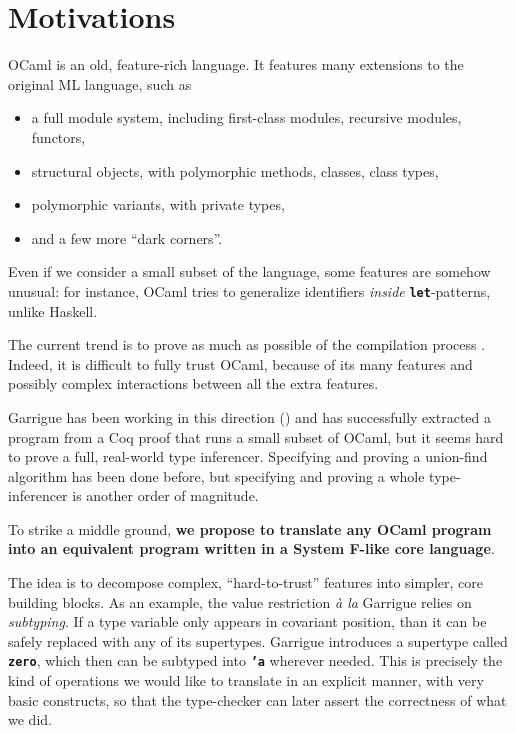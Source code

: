 \documentclass[10pt,a4paper,twoside,titlepage,twocolumn]{article}
\newcommand{\code}[1]{\textbf{\texttt{#1}}}
\begin{document}
\section{Motivations}

OCaml is an old, feature-rich language. It features many extensions to the
original ML language, such as
\begin{itemize}
  \item a full module system, including first-class modules, recursive modules,
    functors,
  \item structural objects, with polymorphic methods, classes, class types,
  \item polymorphic variants, with private types,
  \item and a few more ``dark corners''.
\end{itemize}

Even if we consider a small subset of the language, some features are somehow
unusual: for instance, OCaml tries to generalize identifiers \emph{inside}
\code{let}-patterns, unlike Haskell.

The current trend is to prove as much as possible of the compilation process
\cite{compcert}.  Indeed, it is difficult to fully trust OCaml, because of its
many features and possibly complex interactions between all the extra features.

Garrigue has been working in this direction (\cite{garrigue-certified}) and has
successfully extracted a program from a Coq proof that runs a small subset of
OCaml, but it seems hard to prove a full, real-world type inferencer. Specifying
and proving a union-find algorithm has been done before, but specifying and
proving a whole type-inferencer is another order of magnitude.

To strike a middle ground, \textbf{we propose to translate any OCaml program
into an equivalent program written in a System F-like core language}.

The idea is to decompose complex, ``hard-to-trust'' features into simpler, core
building blocks. As an example, the value restriction \emph{à la} Garrigue
\cite{garrigue2004relaxing} relies on \emph{subtyping}. If a type variable only
appears in covariant position, than it can be safely replaced with any of its
supertypes. Garrigue introduces a supertype called \code{zero}, which then can
be subtyped into \code{'a} wherever needed. This is precisely the kind of
operations we would like to translate in an explicit manner, with very basic
constructs, so that the type-checker can later assert the correctness of what we
did.
\end{document}
